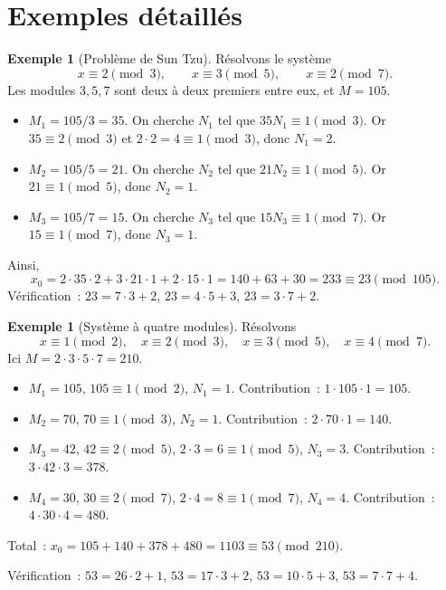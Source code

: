 \documentclass[12pt,a4paper,openany]{book}
\theoremstyle{definition}
\newtheorem{exemple}[definition]{Exemple}
\theoremstyle{plain}
\theoremstyle{remark}
\begin{document}
\section{Exemples détaillés}
\label{sec:crt:exemples}

\begin{exemple}[Problème de Sun Tzu]
\label{ex:crt-sun-tzu}
Résolvons le système
\[
  x \equiv 2 \pmod{3}, \qquad x \equiv 3 \pmod{5}, \qquad x \equiv 2 \pmod{7}.
\]
Les modules $3, 5, 7$ sont deux à deux premiers entre eux, et $M = 105$.
\begin{itemize}
  \item $M_1 = 105/3 = 35$. On cherche $N_1$ tel que $35 N_1 \equiv 1 \pmod{3}$.
        Or $35 \equiv 2 \pmod{3}$ et $2 \cdot 2 = 4 \equiv 1 \pmod{3}$,
        donc $N_1 = 2$.
  \item $M_2 = 105/5 = 21$. On cherche $N_2$ tel que $21 N_2 \equiv 1 \pmod{5}$.
        Or $21 \equiv 1 \pmod{5}$, donc $N_2 = 1$.
  \item $M_3 = 105/7 = 15$. On cherche $N_3$ tel que $15 N_3 \equiv 1 \pmod{7}$.
        Or $15 \equiv 1 \pmod{7}$, donc $N_3 = 1$.
\end{itemize}
Ainsi,
\[
  x_0 = 2 \cdot 35 \cdot 2 + 3 \cdot 21 \cdot 1 + 2 \cdot 15 \cdot 1
      = 140 + 63 + 30 = 233 \equiv 23 \pmod{105}.
\]
Vérification~: $23 = 7 \cdot 3 + 2$, $23 = 4 \cdot 5 + 3$,
$23 = 3 \cdot 7 + 2$. \checkmark
\end{exemple}

\begin{exemple}[Système à quatre modules]
\label{ex:crt-quatre-modules}
Résolvons
\[
  x \equiv 1 \pmod{2}, \quad x \equiv 2 \pmod{3}, \quad
  x \equiv 3 \pmod{5}, \quad x \equiv 4 \pmod{7}.
\]
Ici $M = 2 \cdot 3 \cdot 5 \cdot 7 = 210$.
\begin{itemize}
  \item $M_1 = 105$, $105 \equiv 1 \pmod{2}$, $N_1 = 1$.
        Contribution~: $1 \cdot 105 \cdot 1 = 105$.
  \item $M_2 = 70$, $70 \equiv 1 \pmod{3}$, $N_2 = 1$.
        Contribution~: $2 \cdot 70 \cdot 1 = 140$.
  \item $M_3 = 42$, $42 \equiv 2 \pmod{5}$, $2 \cdot 3 = 6 \equiv 1 \pmod{5}$,
        $N_3 = 3$. Contribution~: $3 \cdot 42 \cdot 3 = 378$.
  \item $M_4 = 30$, $30 \equiv 2 \pmod{7}$, $2 \cdot 4 = 8 \equiv 1 \pmod{7}$,
        $N_4 = 4$. Contribution~: $4 \cdot 30 \cdot 4 = 480$.
\end{itemize}
Total~: $x_0 = 105 + 140 + 378 + 480 = 1103 \equiv 53 \pmod{210}$.

Vérification~: $53 = 26 \cdot 2 + 1$, $53 = 17 \cdot 3 + 2$,
$53 = 10 \cdot 5 + 3$, $53 = 7 \cdot 7 + 4$. \checkmark
\end{exemple}
\end{document}
